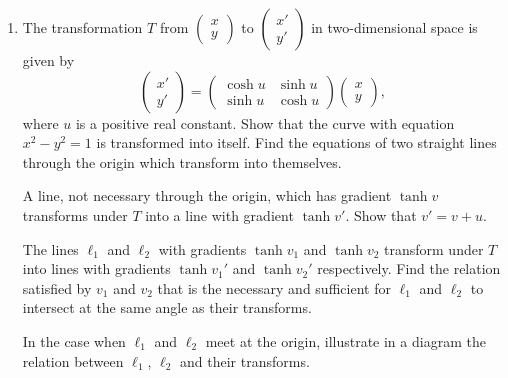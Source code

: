 \documentclass[a4, 11pt]{report}
\newlength{\qspace}
\newcounter{qnumber}
\newenvironment{question}%
 {\vspace{\qspace}
  \begin{enumerate}[\bfseries 1\quad][10]%
    \setcounter{enumi}{\value{qnumber}}%
    \item%
 }
{
  \end{enumerate}
  \filbreak
  \stepcounter{qnumber}
 }
\begin{document}
	\begin{question}
The transformation $T$ from $\begin{pmatrix}x\\
y
\end{pmatrix}$ to $\begin{pmatrix}x'\\
y'
\end{pmatrix}$ in two-dimensional space is given by 
\[
\begin{pmatrix}x'\\
y'
\end{pmatrix}=\begin{pmatrix}\cosh u & \sinh u\\
\sinh u & \cosh u
\end{pmatrix}\begin{pmatrix}x\\
y
\end{pmatrix},
\]
where $u$ is a positive real constant. Show that the curve with equation
$x^{2}-y^{2}=1$ is transformed into itself. Find the equations of
two straight lines through the origin which transform into themselves. 


A line, not necessary through the origin, which has gradient $\tanh v$
transforms under $T$ into a line with gradient $\tanh v'$. Show
that $v'=v+u$. 


The lines $\ell_{1}$ and $\ell_{2}$ with gradients $\tanh v_{1}$
and $\tanh v_{2}$ transform under $T$ into lines with gradients
$\tanh v_{1}'$ and $\tanh v_{2}'$ respectively. Find the relation
satisfied by $v_{1}$ and $v_{2}$ that is the necessary and sufficient
for $\ell_{1}$ and $\ell_{2}$ to intersect at the same angle as
their transforms. 


In the case when $\ell_{1}$ and $\ell_{2}$ meet at the origin, illustrate
in a diagram the relation between $\ell_{1}$, $\ell_{2}$ and their
transforms.
	 \end{question}
	 
\end{document}
